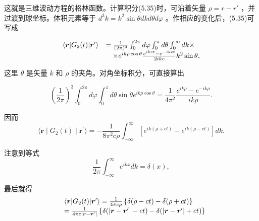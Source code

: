 这就是三维波动方程的格林函数。计算积分(5.35)时，可沿着矢量 $\rho = r - r'$ ，并过渡到球坐标。体积元素等于 $d^{3}k = k^{2}\sin\theta dkd\theta d\varphi$ 。作相应的变化后，(5.35)可写成

\begin{equation*}
\begin{array}{r l} \langle \boldsymbol {r} | G _ {2} (t) | \boldsymbol {r} ^ {\prime} \rangle & = \frac {1}{(2 \pi) ^ {3}} \int_ {0} ^ {2 \pi} d \varphi \int_ {0} ^ {\pi} d \theta \int_ {0} ^ {\infty} d k \times \\ & \quad \times e ^ {i k \rho \cos \theta} \frac {e ^ {i k c t} - e ^ {- i k c t}}{2 i k c} k ^ {2} \sin \theta , \end{array}
\end{equation*}

这里 $\theta$ 是矢量 $k$ 和 $\rho$ 的夹角。对角坐标积分，可直接算出

\begin{equation*}
\left(\frac {1}{2 \pi}\right) ^ {3} \int_ {0} ^ {2 \pi} d \varphi \int_ {0} ^ {\pi} d \theta \sin \theta e ^ {i k \rho \cos \theta} = \frac {1}{4 \pi^ {2}} \frac {e ^ {i k \rho} - e ^ {- i k \rho}}{i k \rho}.
\end{equation*}

因而
\begin{equation*}
\langle \boldsymbol {r} \mid G _ {2} (t) \mid \boldsymbol {r} ^ {\prime} \rangle = - \frac {1}{8 \pi^ {2} c \rho} \int_ {- \infty} ^ {\infty} [ e ^ {i k (\rho + c t)} - e ^ {i k (\rho - c t)} ] d k.
\end{equation*}

注意到等式
\begin{equation*}
\frac {1}{2 \pi} \int_ {- \infty} ^ {\infty} e ^ {i k x} d k = \delta (x),
\end{equation*}

最后就得
\begin{equation*}
\begin{array}{r l} & \langle \boldsymbol {r} | G _ {2} (t) | \boldsymbol {r} ^ {\prime} \rangle = \frac {1}{4 \pi c \rho} \left\{\delta (\rho - c t) - \delta (\rho + c t) \right\} \\ & = \frac {1}{4 \pi c | \boldsymbol {r} - \boldsymbol {r} ^ {\prime} |} \left\{\delta (| \boldsymbol {r} - \boldsymbol {r} ^ {\prime} | - c t) - \delta (| \boldsymbol {r} - \boldsymbol {r} ^ {\prime} | + c t) \right\} \end{array}
\end{equation*}

